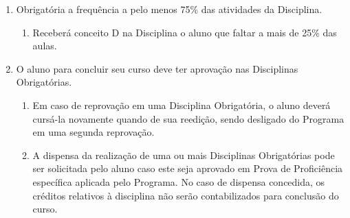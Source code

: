 \documentclass{article}
\newcommand{\singleitem}{\item[Parágrafo Único.]}
\begin{document}
\begin{enumerate}
	\item  Obrigatória a frequência a pelo menos 75\% das atividades da Disciplina.
	\begin{enumerate}
		\singleitem Receberá conceito D na Disciplina o aluno que faltar a mais de 25\% das aulas.
	\end{enumerate}

	\item O aluno para concluir seu curso deve ter aprovação nas Disciplinas Obrigatórias.
	\begin{enumerate}
		\item Em caso de reprovação em uma Disciplina Obrigatória, o aluno deverá cursá-la novamente quando de sua reedição, sendo desligado do Programa em uma segunda reprovação.
		\item A dispensa da realização de uma ou mais Disciplinas Obrigatórias pode ser solicitada pelo aluno caso este seja aprovado em Prova de Proficiência específica aplicada pelo Programa. No caso de dispensa concedida, os créditos relativos à disciplina não serão contabilizados para conclusão do curso.
	\end{enumerate}
\end{enumerate}
\end{document}
